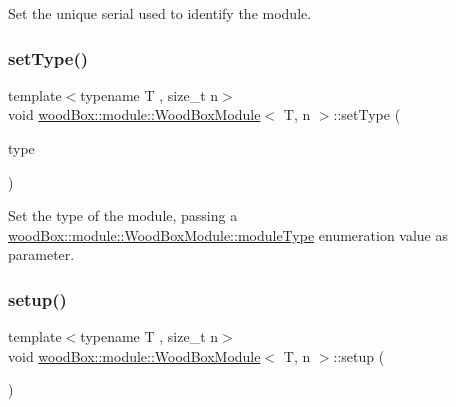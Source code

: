 Set the unique serial used to identify the module. \mbox{\label{classwood_box_1_1module_1_1_wood_box_module_a807efbd90ccdd796bfc62c15bfbc81ab}} 
\subsubsection{\texorpdfstring{set\+Type()}{setType()}}
{\footnotesize\ttfamily template$<$typename T , size\+\_\+t n$>$ \\
void \mbox{\hyperlink{classwood_box_1_1module_1_1_wood_box_module}{wood\+Box\+::module\+::\+Wood\+Box\+Module}}$<$ T, n $>$\+::set\+Type (\begin{DoxyParamCaption}\item[{\mbox{\hyperlink{classwood_box_1_1module_1_1_wood_box_module_af74476c8a785de7fe587c4fb68435673}{module\+Type}}}]{type }\end{DoxyParamCaption})\hspace{0.3cm}{\ttfamily [inline]}}

Set the type of the module, passing a \mbox{\hyperlink{classwood_box_1_1module_1_1_wood_box_module_af74476c8a785de7fe587c4fb68435673}{wood\+Box\+::module\+::\+Wood\+Box\+Module\+::module\+Type}} enumeration value as parameter. \mbox{\label{classwood_box_1_1module_1_1_wood_box_module_a610b2339bd0ff26d2cde59d2006a4aed}} 
\subsubsection{\texorpdfstring{setup()}{setup()}}
{\footnotesize\ttfamily template$<$typename T , size\+\_\+t n$>$ \\
void \mbox{\hyperlink{classwood_box_1_1module_1_1_wood_box_module}{wood\+Box\+::module\+::\+Wood\+Box\+Module}}$<$ T, n $>$\+::setup (\begin{DoxyParamCaption}{ }\end{DoxyParamCaption})\hspace{0.3cm}{\ttfamily [inline]}}

